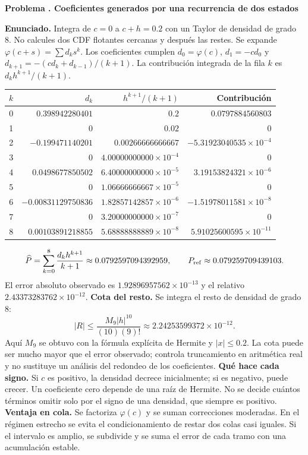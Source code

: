 \documentclass[11pt,a4paper]{article}
\theoremstyle{definition}
\newcounter{problema}
\newenvironment{resuelto}[1]{\refstepcounter{problema}\par\medskip\Needspace{6\baselineskip}\textbf{Problema \theproblema. #1}\par}{\par\medskip}
\begin{document}
\begin{resuelto}{Coeficientes generados por una recurrencia de dos estados}
\textbf{Enunciado.} Integra de $c=0$ a $c+h=0.2$ con un Taylor de densidad de grado 8. No calcules dos CDF flotantes cercanas y después las restes.
Se expande $\varphi(c+s)=\sum d_ks^k$. Los coeficientes cumplen $d_0=\varphi(c)$, $d_1=-cd_0$ y $d_{k+1}=-(cd_k+d_{k-1})/(k+1)$. La contribución integrada de la fila $k$ es $d_kh^{k+1}/(k+1)$.

\begin{center}\small\begin{tabular}{rrrr}
\toprule
$k$&$d_k$&$h^{k+1}/(k+1)$&Contribución\\
\midrule
0&$0.398942280401$&$0.2$&$0.0797884560803$\\
1&$0$&$0.02$&$0$\\
2&$-0.199471140201$&$0.00266666666667$&$-5.31923040535\times10^{-4}$\\
3&$0$&$4.00000000000\times10^{-4}$&$0$\\
4&$0.0498677850502$&$6.40000000000\times10^{-5}$&$3.19153824321\times10^{-6}$\\
5&$0$&$1.06666666667\times10^{-5}$&$0$\\
6&$-0.00831129750836$&$1.82857142857\times10^{-6}$&$-1.51978011581\times10^{-8}$\\
7&$0$&$3.20000000000\times10^{-7}$&$0$\\
8&$0.00103891218855$&$5.68888888889\times10^{-8}$&$5.91025600595\times10^{-11}$\\
\bottomrule\end{tabular}\end{center}
\[
\widehat P=\sum_{k=0}^{8}\frac{d_kh^{k+1}}{k+1}\approx0.0792597094392959,\qquad P_{\rm ref}\approx0.079259709439103.
\]
El error absoluto observado es $1.92896957562\times10^{-13}$ y el relativo $2.43373283762\times10^{-12}$.
\textbf{Cota del resto.} Se integra el resto de densidad de grado $8$:
\[
|R|\le\frac{M_{9}|h|^{10}}{(10)(9)!}\approx2.24253599372\times10^{-12}.
\]
Aquí $M_{9}$ se obtuvo con la fórmula explícita de Hermite y $|x|\le0.2$. La cota puede ser mucho mayor que el error observado; controla truncamiento en aritmética real y no sustituye un análisis del redondeo de los coeficientes.
\textbf{Qué hace cada signo.} Si $c$ es positivo, la densidad decrece inicialmente; si es negativo, puede crecer. Un coeficiente cero depende de una raíz de Hermite. No se decide cuántos términos omitir solo por el signo de una densidad, que siempre es positivo.
\textbf{Ventaja en cola.} Se factoriza $\varphi(c)$ y se suman correcciones moderadas. En el régimen estrecho se evita el condicionamiento de restar dos colas casi iguales. Si el intervalo es amplio, se subdivide y se suma el error de cada tramo con una acumulación estable.
\end{resuelto}
\end{document}
